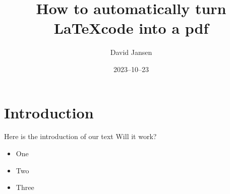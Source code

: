 \documentclass[12pt]{article}
\title{How to automatically turn \LaTeX code into a pdf}
\author{David Jansen}
\date{2023–10–23}
\begin{document}
\maketitle

\section{Introduction}

Here is the introduction of our text
Will it work?

\begin{itemize}

\item One

\item Two

\item Three

\end{itemize}
\end{document}
